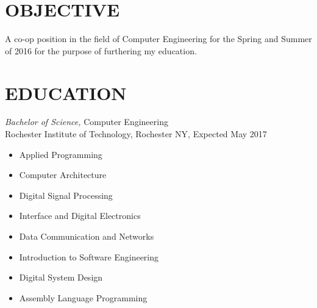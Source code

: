 \documentclass[line,margin]{res}
\begin{document}
\setlength\columnsep{-30pt}
\address{CRC3510@RIT.EDU}
\address{(413) 376-5034}
 
\begin{resume}
 \setlength\multicolsep{2pt}

\section{OBJECTIVE}   
	A co-op position in the field of Computer Engineering for the Spring and Summer of 2016 for the purpose of furthering my education.  
 
\section{EDUCATION} {\sl Bachelor of Science,} Computer Engineering \\
                Rochester Institute of Technology, Rochester NY, 
				Expected May 2017 %
				\begin{multicols}{2}
					\begin{itemize}
						\itemsep -2pt
						\item[] Applied Programming
						\item[] Computer Architecture 
						\item[] Digital Signal Processing
						\item[] Interface and Digital Electronics
						\item[] Data Communication and Networks
						\item[] Introduction to Software Engineering
						\item[] Digital System Design
						\item[] Assembly Language Programming
					\end{itemize}
				\end{multicols}
 

\end{resume}
\end{document}
